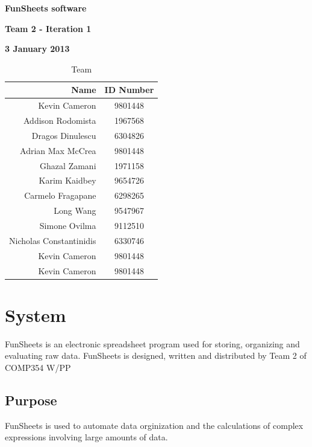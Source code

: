 \documentclass[12pt]{article}
\begin{document}
\vspace*{0.5in}
\centerline{\bf\Large FunSheets software}

\vspace*{0.5in}
\centerline{\bf\Large Team 2 - Iteration 1}

\vspace*{0.5in}
\centerline{\bf\Large 3 January 2013}

\vspace*{1.5in}
\begin{table}[htbp]
\caption{Team}
\begin{center}
\begin{tabular}{|r | c|}
\hline
Name & ID Number \\\hline\hline
Kevin Cameron & 9801448 \\\hline\hline
Addison Rodomista & 1967568 \\\hline\hline
Dragos Dinulescu & 6304826 \\\hline\hline
Adrian Max McCrea & 9801448 \\\hline\hline
Ghazal Zamani & 1971158 \\\hline\hline
Karim Kaidbey & 9654726 \\\hline\hline
Carmelo Fragapane & 6298265 \\\hline\hline
Long Wang & 9547967 \\\hline\hline
Simone Ovilma & 9112510 \\\hline\hline
Nicholas Constantinidis & 6330746 \\\hline\hline
Kevin Cameron & 9801448 \\\hline\hline
Kevin Cameron & 9801448 \\\hline
\end{tabular}
\end{center}
\end{table}

\clearpage

\section{System}
FunSheets is an electronic spreadsheet program used for storing, organizing and evaluating raw data. FunSheets is designed, written and distributed by Team 2 of COMP354 W/PP

\subsection{Purpose}
FunSheets is used to automate data orginization and the calculations of complex expressions involving large amounts of data.
\end{document}
